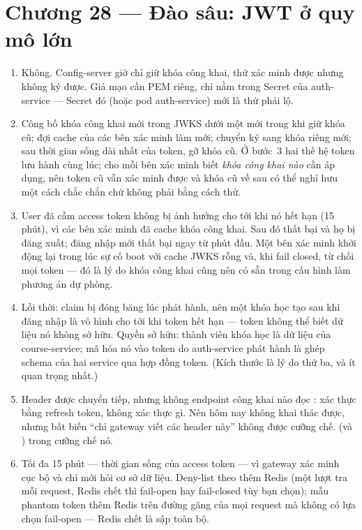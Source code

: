 \section*{Chương 28 --- Đào sâu: JWT ở quy mô lớn}
\begin{enumerate}
  \item Không. Config-server giờ chỉ giữ khóa công khai, thứ xác minh
  được nhưng không ký được. Giả mạo cần PEM riêng, chỉ nằm trong Secret
  của auth-service --- Secret đó (hoặc pod auth-service) mới là thứ
  phải lộ.
  \item Công bố khóa công khai mới trong JWKS dưới một  mới
  trong khi giữ khóa cũ; đợi cache của các bên xác minh làm mới; chuyển
  ký sang khóa riêng mới; sau thời gian sống dài nhất của token, gỡ
  khóa cũ. Ở bước~3 hai thế hệ token lưu hành cùng lúc;  cho
  mỗi bên xác minh biết \emph{khóa công khai nào} cần áp dụng, nên
  token cũ vẫn xác minh được và khóa cũ về sau có thể nghỉ hưu một cách
  chắc chắn chứ không phải bằng cách thử.
  \item User đã cầm access token không bị ảnh hưởng cho tới khi nó hết
  hạn (15 phút), vì các bên xác minh đã cache khóa công khai. Sau đó
   thất bại và họ bị đăng xuất; đăng nhập mới thất bại
  ngay từ phút đầu. Một bên xác minh khởi động lại trong lúc sự cố boot
  với cache JWKS rỗng và, khi fail closed, từ chối mọi token --- đó là
  lý do khóa công khai cũng nên có sẵn trong cấu hình làm phương án dự
  phòng.
  \item Lỗi thời: claim bị đóng băng lúc phát hành, nên một khóa học
  tạo sau khi đăng nhập là vô hình cho tới khi token hết hạn --- token
  không thể biết dữ liệu nó không sở hữu. Quyền sở hữu: thành viên khóa
  học là dữ liệu của course-service; mã hóa nó vào token do auth-service
  phát hành là ghép schema của hai service qua hợp đồng token. (Kích
  thước là lý do thứ ba, và ít quan trọng nhất.)
  \item Header được chuyển tiếp, nhưng không endpoint công khai nào đọc
  :  xác thực bằng refresh token,
   không xác thực gì. Nên hôm nay không khai thác được,
  nhưng bất biến ``chỉ gateway viết các header này'' không được cưỡng
  chế.  (và
  ) trong  cưỡng chế nó.
  \item Tối đa 15 phút --- thời gian sống của access token --- vì
  gateway xác minh cục bộ và chỉ  mới hỏi cơ sở dữ liệu.
  Deny-list theo  thêm Redis (một lượt tra mỗi request, Redis
  chết thì fail-open hay fail-closed tùy bạn chọn); mẫu phantom token
  thêm Redis trên đường găng của mọi request mà không có lựa chọn
  fail-open --- Redis chết là sập toàn bộ.
\end{enumerate}

